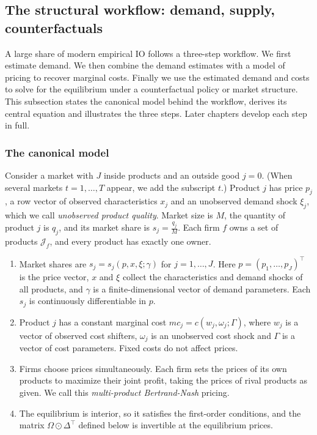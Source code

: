 \subsection{The structural workflow: demand, supply, counterfactuals}\label{sec:01-workflow}

A large share of modern empirical IO follows a three-step workflow. We first estimate demand. We then
combine the demand estimates with a model of pricing to recover marginal costs. Finally we use the
estimated demand and costs to solve for the equilibrium under a counterfactual policy or market structure.
This subsection states the canonical model behind the workflow, derives its central equation and
illustrates the three steps. Later chapters develop each step in full.

\subsubsection{The canonical model}

Consider a market with $J$ inside products and an outside good $j = 0$. (When several markets
$t = 1, \dots, T$ appear, we add the subscript $t$.) Product $j$ has price $p_j$, a row vector of observed
characteristics $x_j$ and an unobserved demand shock $\xi_j$, which we call \emph{unobserved product
quality}. Market size is $M$, the quantity of product $j$ is $q_j$, and its market share is
$s_j = \frac{q_j}{M}$. Each firm $f$ owns a set of products $\mathcal{J}_f$, and every product has exactly
one owner.

\begin{assumption}\label{ass:01-canonical}
\leavevmode
\begin{enumerate}[label=(\roman*)]
  \item Market shares are $s_j = s_j(p, x, \xi; \gamma)$ for $j = 1, \dots, J$. Here
        $p = (p_1, \dots, p_J)^\top$ is the price vector, $x$ and $\xi$ collect the characteristics and
        demand shocks of all products, and $\gamma$ is a finite-dimensional vector of demand parameters.
        Each $s_j$ is continuously differentiable in $p$.
  \item Product $j$ has a constant marginal cost $mc_j = c(w_j, \omega_j; \Gamma)$, where $w_j$ is a vector
        of observed cost shifters, $\omega_j$ is an unobserved cost shock and $\Gamma$ is a vector of cost
        parameters. Fixed costs do not affect prices.
  \item Firms choose prices simultaneously. Each firm sets the prices of its own products to maximize their
        joint profit, taking the prices of rival products as given. We call this \emph{multi-product
        Bertrand-Nash} pricing.
  \item The equilibrium is interior, so it satisfies the first-order conditions, and the matrix
        $\Omega \odot \Delta^\top$ defined below is invertible at the equilibrium prices.
\end{enumerate}
\end{assumption}

